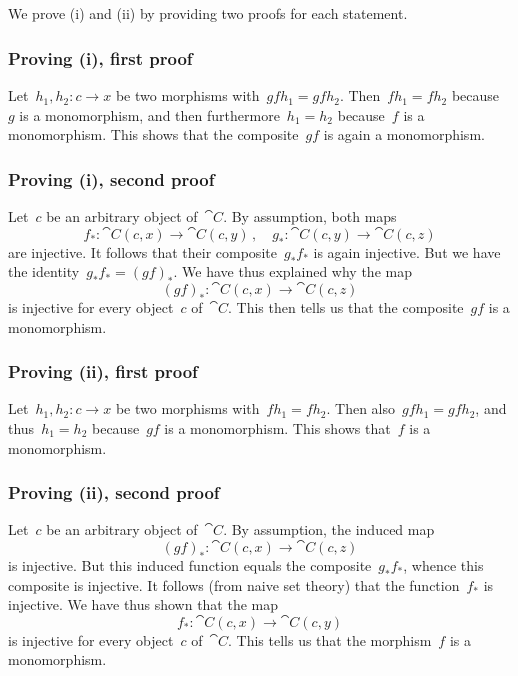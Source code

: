 \subsection{}

We prove (i) and (ii) by providing two proofs for each statement.



\subsubsection*{Proving (i), first proof}

Let~$h_1, h_2 \colon c \to x$ be two morphisms with~$gf h_1 = gf h_2$.
Then~$f h_1 = f h_2$ because~$g$ is a monomorphism, and then furthermore~$h_1 = h_2$ because~$f$ is a monomorphism.
This shows that the composite~$g f$ is again a monomorphism.



\subsubsection*{Proving (i), second proof}

Let~$c$ be an arbitrary object of~$\cat{C}$.
By assumption, both maps
\[
	f_* \colon \cat{C}(c, x) \to \cat{C}(c, y) \,,
	\quad
	g_* \colon \cat{C}(c, y) \to \cat{C}(c, z)
\]
are injective.
It follows that their composite~$g_* f_*$ is again injective.
But we have the identity~$g_* f_* = (g f)_*$.
We have thus explained why the map
\[
	(g f)_* \colon \cat{C}(c, x) \to \cat{C}(c, z)
\]
is injective for every object~$c$ of~$\cat{C}$.
This then tells us that the composite~$g f$ is a monomorphism.



\subsubsection*{Proving (ii), first proof}

Let~$h_1, h_2 \colon c \to x$ be two morphisms with~$f h_1 = f h_2$.
Then also~$g f h_1 = g f h_2$, and thus~$h_1 = h_2$ because~$g f$ is a monomorphism.
This shows that~$f$ is a monomorphism.



\subsubsection*{Proving (ii), second proof}

Let~$c$ be an arbitrary object of~$\cat{C}$.
By assumption, the induced map
\[
	(g f)_* \colon \cat{C}(c, x) \to \cat{C}(c, z)
\]
is injective.
But this induced function equals the composite~$g_* f_*$, whence this composite is injective.
It follows (from naive set theory) that the function~$f_*$ is injective.
We have thus shown that the map
\[
	f_* \colon \cat{C}(c, x) \to \cat{C}(c, y)
\]
is injective for every object~$c$ of~$\cat{C}$.
This tells us that the morphism~$f$ is a monomorphism.



